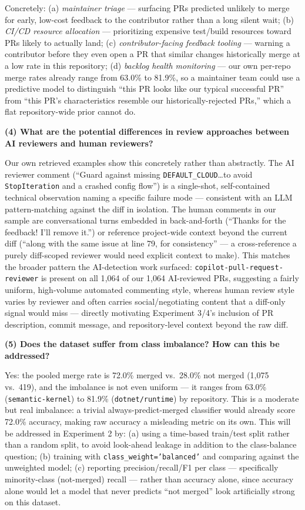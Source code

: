 \documentclass{experimentreport}
\begin{document}
{Concretely: (a) \emph{maintainer triage} --- surfacing PRs predicted unlikely to merge for early,
low-cost feedback to the contributor rather than a long silent wait; (b) \emph{CI/CD resource
allocation} --- prioritizing expensive test/build resources toward PRs likely to actually land;
(c) \emph{contributor-facing feedback tooling} --- warning a contributor before they even open a
PR that similar changes historically merge at a low rate in this repository; (d) \emph{backlog
health monitoring} --- our own per-repo merge rates already range from 63.0\% to 81.9\%, so a
maintainer team could use a predictive model to distinguish ``this PR looks like our typical
successful PR'' from ``this PR's characteristics resemble our historically-rejected PRs,'' which a
flat repository-wide prior cannot do.

\textbf{(4) What are the potential differences in review approaches between AI reviewers and
human reviewers?}

Our own retrieved examples show this concretely rather than abstractly. The AI reviewer comment
(``Guard against missing \texttt{DEFAULT\_CLOUD}\ldots to avoid \texttt{StopIteration} and a
crashed config flow'') is a single-shot, self-contained technical observation naming a specific
failure mode --- consistent with an LLM pattern-matching against the diff in isolation. The human
comments in our sample are conversational turns embedded in back-and-forth (``Thanks for the
feedback! I'll remove it.'') or reference project-wide context beyond the current diff (``along
with the same issue at line 79, for consistency'' --- a cross-reference a purely diff-scoped
reviewer would need explicit context to make). This matches the broader pattern the AI-detection
work surfaced: \texttt{copilot-pull-request-reviewer} is present on all 1{,}064 of our 1{,}064
AI-reviewed PRs, suggesting a fairly uniform, high-volume automated commenting style, whereas
human review style varies by reviewer and often carries social/negotiating content that a
diff-only signal would miss --- directly motivating Experiment 3/4's inclusion of PR description,
commit message, and repository-level context beyond the raw diff.

\textbf{(5) Does the dataset suffer from class imbalance? How can this be addressed?}

Yes: the pooled merge rate is 72.0\% merged vs.\ 28.0\% not merged (1{,}075 vs.\ 419), and the
imbalance is not even uniform --- it ranges from 63.0\% (\texttt{semantic-kernel}) to 81.9\%
(\texttt{dotnet/runtime}) by repository. This is a moderate but real imbalance: a trivial
always-predict-merged classifier would already score 72.0\% accuracy, making raw accuracy a
misleading metric on its own. This will be addressed in Experiment 2 by: (a) using a time-based
train/test split rather than a random split, to avoid look-ahead leakage in addition to the
class-balance question; (b) training with \texttt{class\_weight='balanced'} and comparing against
the unweighted model; (c) reporting precision/recall/F1 per class --- specifically minority-class
(not-merged) recall --- rather than accuracy alone, since accuracy alone would let a model that
never predicts ``not merged'' look artificially strong on this dataset.

}


\teachercomment
\end{document}
